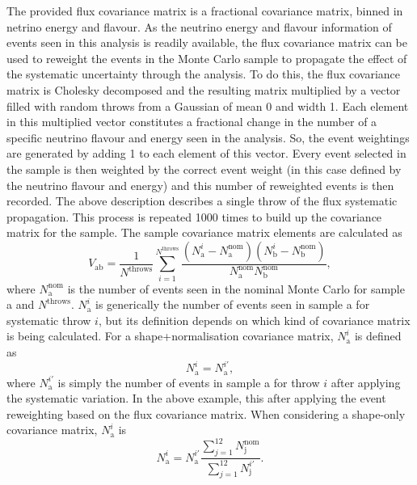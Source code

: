 The provided flux covariance matrix is a fractional covariance matrix, binned in netrino energy and flavour.  As the neutrino energy and flavour information of events seen in this analysis is readily available, the flux covariance matrix can be used to reweight the events in the Monte Carlo sample to propagate the effect of the systematic uncertainty through the analysis.  To do this, the flux covariance matrix is Cholesky decomposed and the resulting matrix multiplied by a vector filled with random throws from a Gaussian of mean 0 and width 1.  Each element in this multiplied vector constitutes a fractional change in the number of a specific neutrino flavour and energy seen in the analysis.  So, the event weightings are generated by adding 1 to each element of this vector.  Every event selected in the sample is then weighted by the correct event weight (in this case defined by the neutrino flavour and energy) and this number of reweighted events is then recorded.  The above description describes a single throw of the flux systematic propagation.  This process is repeated 1000 times to build up the covariance matrix for the sample.  The sample covariance matrix elements are calculated as
\begin{equation}
  V_{\textrm{ab}} = \frac{1}{N^{\textrm{throws}}}\sum^{N^{\textrm{throws}}}_{i=1}\frac{\left(N_{\textrm{a}}^{i} - N_{\textrm{a}}^{\textrm{nom}}\right)\left(N_{\textrm{b}}^{i} - N_{\textrm{b}}^{\textrm{nom}}\right)}{N_{\textrm{a}}^{\textrm{nom}}N_{\textrm{b}}^{\textrm{nom}}},
  \label{eqn:CovarianceMatrixElementDef}
\end{equation}
where $N_{\textrm{a}}^{\textrm{nom}}$ is the number of events seen in the nominal Monte Carlo for sample a and $N^{\textrm{throws}}$. $N_{\textrm{a}}^{i}$ is generically the number of events seen in sample a for systematic throw $i$, but its definition depends on which kind of covariance matrix is being calculated.  For a shape+normalisation covariance matrix, $N_{\textrm{a}}^{i}$ is defined as 
\begin{equation}
  N_{\textrm{a}}^{i} = N^{i\prime}_{\textrm{a}}, 
  \label{eqn:NVariedDef}
\end{equation}
where $N^{i\prime}_{\textrm{a}}$ is simply the number of events in sample a for throw $i$ after applying the systematic variation.  In the above example, this after applying the event reweighting based on the flux covariance matrix.  When considering a shape-only covariance matrix, $N_{\textrm{a}}^{i}$ is 
\begin{equation}
  N_{\textrm{a}}^{i} = N^{i\prime}_{\textrm{a}}\frac{\displaystyle\sum_{j=1}^{12}N_{\textrm{j}}^{\textrm{nom}}}{\displaystyle\sum_{j=1}^{12}N^{i\prime}_{\textrm{j}}}. 
  \label{eqn:NVariedShapeOnlyDef}
\end{equation}

